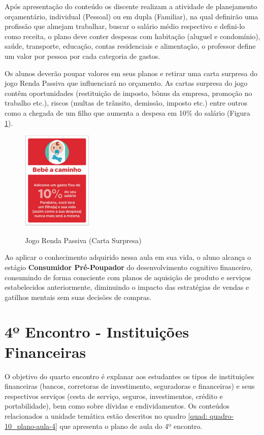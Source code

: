 Após apresentação do conteúdo os discente realizam a atividade de planejamento orçamentário, individual (Pessoal) ou em dupla (Familiar), na qual definirão uma profissão que almejam trabalhar, buscar o salário médio respectivo e defini-lo como receita, o plano deve conter despesas com habitação (aluguel e condomínio), saúde, transporte, educação, contas residenciais e alimentação, o professor define um valor por pessoa por cada categoria de gastos.

Os alunos deverão poupar valores em seus planos e retirar uma carta surpresa do jogo Renda Passiva que influenciará no orçamento. As cartas surpresa do jogo contêm oportunidades (restituição de imposto, bônus da empresa, promoção no trabalho etc.), riscos (multas de trânsito, demissão, imposto etc.) entre outros como a chegada de um filho que aumenta a despesa em 10{\%} do salário (Figura \ref{fig: figura-10-carta-surpresa}).

\graphicspath{{figuras/}} 
\begin{figure}[!ht]
\centering
\begin{minipage}{1.\textwidth}
\caption{Jogo Renda Passiva (Carta Surpresa)}
\centering
\includegraphics[width=0.3\textwidth]{10-figura_carta-surpresa-renda-passiva}
\label{fig: figura-10-carta-surpresa}
\end{minipage}
\end{figure}

Ao aplicar o conhecimento adquirido nessa aula em sua vida, o aluno alcança o estágio \textbf{Consumidor Pré-Poupador} do desenvolvimento cognitivo financeiro, consumindo de forma consciente com planos de aquisição de produto e serviços estabelecidos anteriormente, diminuindo o impacto das estratégias de vendas e gatilhos mentais sem suas decisões de compras.

\section{4º Encontro - Instituições Financeiras}
O objetivo do quarto encontro é explanar aos estudantes os tipos de instituições financeiras (bancos, corretoras de investimento, seguradoras e financeiras) e seus respectivos serviços (cesta de serviço, seguros, investimentos, crédito e portabilidade), bem como sobre dívidas e endividamentos. Os conteúdos relacionados a unidade temática estão descritos no quadro \ref{quad: quadro-10_plano-aula-4} que apresenta o plano de aula do 4º encontro.


